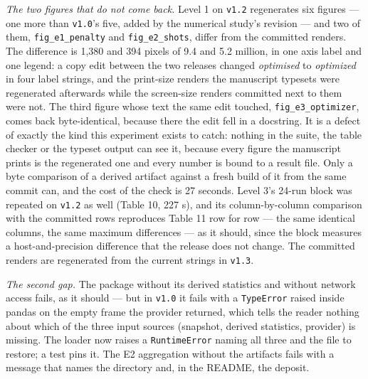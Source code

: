 \documentclass[acmsmall,screen,review]{acmart}
\begin{document}
\textit{The two figures that do not come back.} Level 1 on \texttt{v1.2} regenerates six figures --- one more than \texttt{v1.0}'s five, added by the numerical study's revision --- and two of them, \texttt{fig\_e1\_penalty} and \texttt{fig\_e2\_shots}, differ from the committed renders. The difference is 1,380 and 394 pixels of 9.4 and 5.2 million, in one axis label and one legend: a copy edit between the two releases changed \textit{optimised} to \textit{optimized} in four label strings, and the print-size renders the manuscript typesets were regenerated afterwards while the screen-size renders committed next to them were not. The third figure whose text the same edit touched, \texttt{fig\_\allowbreak{}e3\_\allowbreak{}optimizer}, comes back byte-identical, because there the edit fell in a docstring. It is a defect of exactly the kind this experiment exists to catch: nothing in the suite, the table checker or the typeset output can see it, because every figure the manuscript prints is the regenerated one and every number is bound to a result file. Only a byte comparison of a derived artifact against a fresh build of it from the same commit can, and the cost of the check is 27 seconds. Level 3's 24-run block was repeated on \texttt{v1.2} as well (Table 10, 227 s), and its column-by-column comparison with the committed rows reproduces Table 11 row for row --- the same identical columns, the same maximum differences --- as it should, since the block measures a host-and-precision difference that the release does not change. The committed renders are regenerated from the current strings in \texttt{v1.3}.


\textit{The second gap.} The package without its derived statistics and without network access fails, as it should --- but in \texttt{v1.0} it fails with a \texttt{TypeError} raised inside pandas on the empty frame the provider returned, which tells the reader nothing about which of the three input sources (snapshot, derived statistics, provider) is missing. The loader now raises a \texttt{RuntimeError} naming all three and the file to restore; a test pins it. The E2 aggregation without the artifacts fails with a message that names the directory and, in the README, the deposit.
\end{document}
